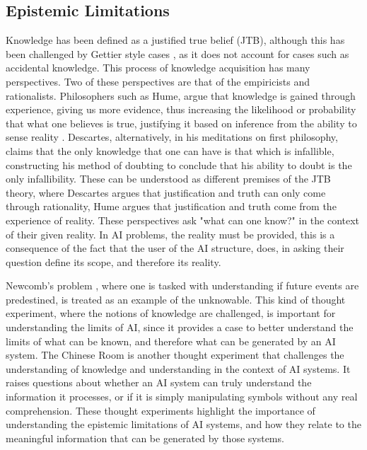 \documentclass[stu,12pt]{apa7}
\theoremstyle{definition}
\begin{document}
\subsection{Epistemic Limitations}

Knowledge has been defined as a justified true belief (JTB), although this has been challenged by Gettier style cases \parencite{sep-epistemology}, as it does not account for cases such as accidental knowledge. This process of knowledge acquisition has many perspectives. Two of these perspectives are that of the empiricists and rationalists. 
Philosophers such as Hume, argue that knowledge is gained through experience, giving us more evidence, thus increasing the likelihood or probability that what one believes is true, justifying it based on inference from the ability to sense reality \parencite{sep-rationalism-empiricism}.
Descartes, alternatively, in his meditations on first philosophy, claims that the only knowledge that one can have is that which is infallible, constructing his method of doubting to conclude that his ability to doubt is the only infallibility. These can be understood as different premises of the JTB theory, where Descartes argues that justification and truth can only come through rationality, Hume argues that justification and truth come from the experience of reality. These perspectives ask "what can one know?" in the context of their given reality. In AI problems, the reality must be provided, this is a consequence of the fact that the user of the AI structure, does, in asking their question define its scope, and therefore its reality.

Newcomb's problem \parencite{nozick1969newcomb}, where one is tasked with understanding if future events are predestined, is treated as an example of the unknowable. This kind of thought experiment, where the notions of knowledge are challenged, is important for understanding the limits of AI, since it provides a case to better understand the limits of what can be known, and therefore what can be generated by an AI system. The Chinese Room \parencite{obermeier1983wittgenstein} is another thought experiment that challenges the understanding of knowledge and understanding in the context of AI systems. It raises questions about whether an AI system can truly understand the information it processes, or if it is simply manipulating symbols without any real comprehension. These thought experiments highlight the importance of understanding the epistemic limitations of AI systems, and how they relate to the meaningful information that can be generated by those systems.
\end{document}
